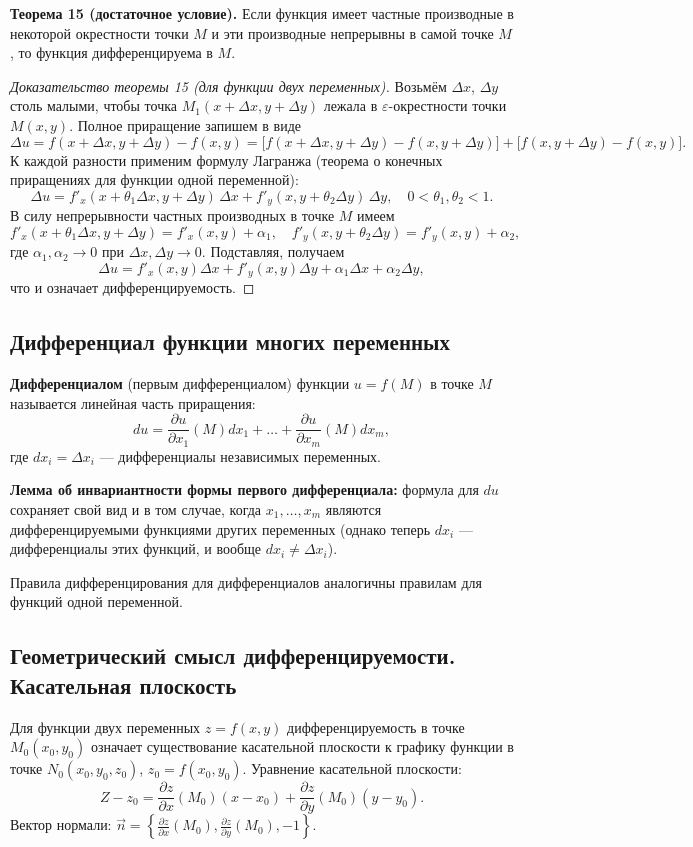 \documentclass{article}
\theoremstyle{definition}
\begin{document}
\textbf{Теорема 15 (достаточное условие).} Если функция имеет частные производные в некоторой окрестности точки $M$ и эти производные непрерывны в самой точке $M$, то функция дифференцируема в $M$.

\begin{proof}[Доказательство теоремы 15 (для функции двух переменных)]
Возьмём $\Delta x$, $\Delta y$ столь малыми, чтобы точка $M_1(x+\Delta x,y+\Delta y)$ лежала в $\varepsilon$-окрестности точки $M(x,y)$. Полное приращение запишем в виде
\[
\Delta u = f(x+\Delta x,y+\Delta y)-f(x,y) = \bigl[f(x+\Delta x,y+\Delta y)-f(x,y+\Delta y)\bigr] + \bigl[f(x,y+\Delta y)-f(x,y)\bigr].
\]
К каждой разности применим формулу Лагранжа (теорема о конечных приращениях для функции одной переменной):
\[
\Delta u = f'_x(x+\theta_1\Delta x, y+\Delta y)\,\Delta x + f'_y(x, y+\theta_2\Delta y)\,\Delta y,\quad 0<\theta_1,\theta_2<1.
\]
В силу непрерывности частных производных в точке $M$ имеем
\[
f'_x(x+\theta_1\Delta x, y+\Delta y)=f'_x(x,y)+\alpha_1,\quad f'_y(x, y+\theta_2\Delta y)=f'_y(x,y)+\alpha_2,
\]
где $\alpha_1,\alpha_2\to0$ при $\Delta x,\Delta y\to0$. Подставляя, получаем
\[
\Delta u = f'_x(x,y)\Delta x + f'_y(x,y)\Delta y + \alpha_1\Delta x + \alpha_2\Delta y,
\]
что и означает дифференцируемость.
\end{proof}

\subsection{Дифференциал функции многих переменных}
\textbf{Дифференциалом} (первым дифференциалом) функции $u=f(M)$ в точке $M$ называется линейная часть приращения:
\[
du = \frac{\partial u}{\partial x_1}(M)dx_1+\dots+\frac{\partial u}{\partial x_m}(M)dx_m,
\]
где $dx_i=\Delta x_i$ — дифференциалы независимых переменных.

\textbf{Лемма об инвариантности формы первого дифференциала:} формула для $du$ сохраняет свой вид и в том случае, когда $x_1,\dots,x_m$ являются дифференцируемыми функциями других переменных (однако теперь $dx_i$ — дифференциалы этих функций, и вообще $dx_i\neq\Delta x_i$).

Правила дифференцирования для дифференциалов аналогичны правилам для функций одной переменной.

\subsection{Геометрический смысл дифференцируемости. Касательная плоскость}
Для функции двух переменных $z=f(x,y)$ дифференцируемость в точке $M_0(x_0,y_0)$ означает существование касательной плоскости к графику функции в точке $N_0(x_0,y_0,z_0)$, $z_0=f(x_0,y_0)$. Уравнение касательной плоскости:
\[
Z-z_0 = \frac{\partial z}{\partial x}(M_0)(x-x_0) + \frac{\partial z}{\partial y}(M_0)(y-y_0).
\]
Вектор нормали: $\vec{n}=\left\{\frac{\partial z}{\partial x}(M_0),\frac{\partial z}{\partial y}(M_0),-1\right\}$.
\end{document}
